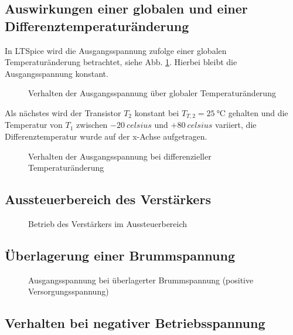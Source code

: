 \subsection{Auswirkungen einer globalen und einer Differenztemperaturänderung}
In LTSpice wird die Ausgangsspannung zufolge einer globalen Temperaturänderung betrachtet, siehe Abb. \ref{fig_Kap5_08:Temp}. Hierbei bleibt die Ausgangsspannung konstant.

\begin{figure}[H]
	\centering \small
	\scalebox{0.9}{}
	\caption{Verhalten der Ausgangsspannung über globaler Temperaturänderung}
	\label{fig_Kap5_08:Temp}
\end{figure}

Als nächstes wird der Transistor $T_2$ konstant bei $T_{T,2} = \SI{25}{\celsius}$ gehalten und die Temperatur von $T_1$ zwischen $-\SI{20}{celsius}$ und $+\SI{80}{celsius}$ variiert, die Differenztemperatur wurde auf der x-Achse aufgetragen.

\begin{figure}[H]
	\centering \small
	\scalebox{0.9}{}
	\caption{Verhalten der Ausgangsspannung bei differenzieller Temperaturänderung}
	\label{fig_Kap5_09:Temp}
\end{figure}

\subsection{Aussteuerbereich des Verstärkers}

\begin{figure}[H]
	\centering \small
	\scalebox{0.9}{}
	\caption{Betrieb des Verstärkers im Aussteuerbereich}
	\label{fig_Kap5_10:Aussteuer}
\end{figure}

\subsection{Überlagerung einer Brummspannung}

\begin{figure}[H]
	\centering \small
	\scalebox{0.9}{}
	\caption{Ausgangsspannung bei überlagerter Brummspannung (positive Versorgungsspannung)}
	\label{fig_Kap5_11:Brumm}
\end{figure}

\subsection{Verhalten bei negativer Betriebsspannung}

